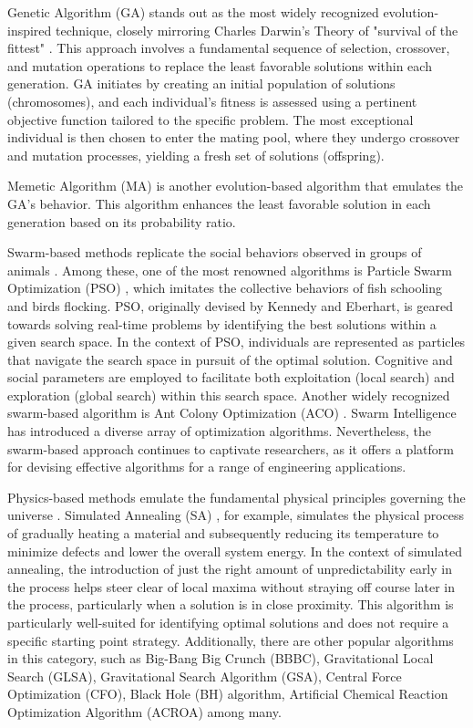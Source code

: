 \documentclass[conference]{IEEEtran}
\begin{document}
\begin{abstract1}
Genetic Algorithm (GA) stands out as the most widely recognized evolution-inspired technique, closely mirroring Charles Darwin's Theory of "survival of the fittest" \cite{holland1992genetic}. This approach involves a fundamental sequence of selection, crossover, and mutation operations to replace the least favorable solutions within each generation. GA initiates by creating an initial population of solutions (chromosomes), and each individual's fitness is assessed using a pertinent objective function tailored to the specific problem. The most exceptional individual is then chosen to enter the mating pool, where they undergo crossover and mutation processes, yielding a fresh set of solutions (offspring).

Memetic Algorithm (MA) \cite{Powell1977} is another evolution-based algorithm that emulates the GA's behavior. This algorithm enhances the least favorable solution in each generation based on its probability ratio.

Swarm-based methods replicate the social behaviors observed in groups of animals \cite{Binitha2012}. Among these, one of the most renowned algorithms is Particle Swarm Optimization (PSO) \cite{Kennedy1995}, which imitates the collective behaviors of fish schooling and birds flocking. PSO, originally devised by Kennedy and Eberhart, is geared towards solving real-time problems by identifying the best solutions within a given search space. In the context of PSO, individuals are represented as particles that navigate the search space in pursuit of the optimal solution. Cognitive and social parameters are employed to facilitate both exploitation (local search) and exploration (global search) within this search space. Another widely recognized swarm-based algorithm is Ant Colony Optimization (ACO) \cite{Dorigo2006}. Swarm Intelligence has introduced a diverse array of optimization algorithms. Nevertheless, the swarm-based approach continues to captivate researchers, as it offers a platform for devising effective algorithms for a range of engineering applications.

Physics-based methods emulate the fundamental physical principles governing the universe \cite{part}. Simulated Annealing (SA) \cite{kirkpatrick1983optimization}, for example, simulates the physical process of gradually heating a material and subsequently reducing its temperature to minimize defects and lower the overall system energy. In the context of simulated annealing, the introduction of just the right amount of unpredictability early in the process helps steer clear of local maxima without straying off course later in the process, particularly when a solution is in close proximity. This algorithm is particularly well-suited for identifying optimal solutions and does not require a specific starting point strategy. Additionally, there are other popular algorithms in this category, such as Big-Bang Big Crunch (BBBC), Gravitational Local Search (GLSA), Gravitational Search Algorithm (GSA), Central Force Optimization (CFO), Black Hole (BH) algorithm, Artificial Chemical Reaction Optimization Algorithm (ACROA) among many.


\end{abstract1}
\end{document}
